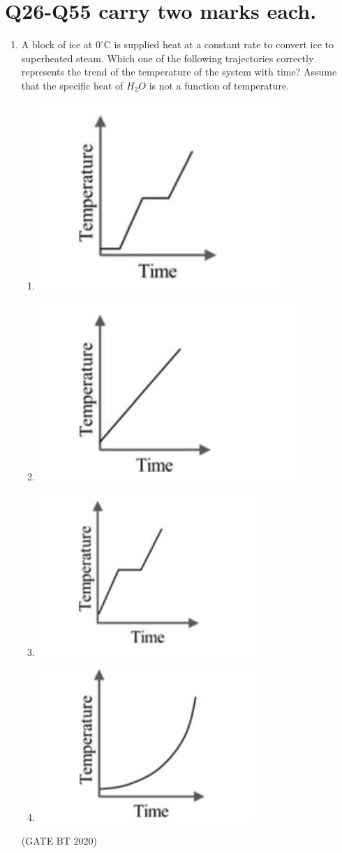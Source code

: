 \documentclass[journal,12pt,onecolumn]{IEEEtran}
\theoremstyle{remark}
\begin{document}
\section{Q26-Q55 carry two marks each.}
\begin{enumerate}[label=Q\arabic*:, start=26, leftmargin=2em]
\item  A block of ice at $0^{\circ}\mathrm{C}$  is supplied heat at a constant rate to convert ice to superheated steam. Which one of the following trajectories correctly represents the trend of the temperature of the system with time? Assume that the specific heat of $H_2O$ is not a function of temperature.
\begin{multicols}{2}
\begin{enumerate}[label=\alph*)]

\item \includegraphics[width=0.4\columnwidth]{figs/fig_1.jpeg}
\item \includegraphics[width=0.4\columnwidth]{figs/fig_2.jpeg}
\item \includegraphics[width=0.4\columnwidth]{figs/fig_3.jpeg} 
\item \includegraphics[width=0.4\columnwidth]{figs/fig_4.jpeg}
\end{enumerate}
\end{multicols}
\hfill(GATE BT 2020)



\end{enumerate}
\end{document}

